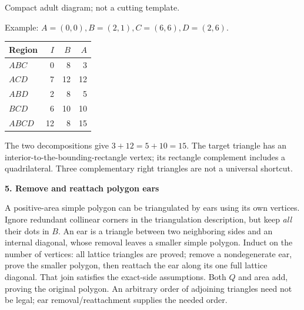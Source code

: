 \documentclass[letterpaper,11pt]{article}
\newcommand{\subhead}[1]{\vspace{2pt}\textbf{#1}\par}
\begin{document}
\begin{center}
\begin{minipage}{.38\linewidth}\centering
{}\par\small Compact adult diagram; not a cutting template.
\end{minipage}\hfill
\begin{minipage}{.58\linewidth}
Example: $A=(0,0),B=(2,1),C=(6,6),D=(2,6)$.
\begin{tabular}{@{}lrrr@{}}\toprule
Region & $I$ & $B$ & $A$\\\midrule
$ABC$ & 0 & 8 & 3\\
$ACD$ & 7 & 12 & 12\\
$ABD$ & 2 & 8 & 5\\
$BCD$ & 6 & 10 & 10\\
$ABCD$ & 12 & 8 & 15\\\bottomrule
\end{tabular}\par
The two decompositions give $3+12=5+10=15$. The target triangle has an interior-to-the-bounding-rectangle vertex; its rectangle complement includes a quadrilateral. Three complementary right triangles are not a universal shortcut.
\end{minipage}
\end{center}

\subhead{5. Remove and reattach polygon ears}
A positive-area simple polygon can be triangulated by ears using its own vertices. Ignore redundant collinear corners in the triangulation description, but keep \emph{all} their dots in $B$. An ear is a triangle between two neighboring sides and an internal diagonal, whose removal leaves a smaller simple polygon. Induct on the number of vertices: all lattice triangles are proved; remove a nondegenerate ear, prove the smaller polygon, then reattach the ear along its one full lattice diagonal. That join satisfies the exact-side assumptions. Both $Q$ and area add, proving the original polygon. An arbitrary order of adjoining triangles need not be legal; ear removal/reattachment supplies the needed order.
\end{document}
